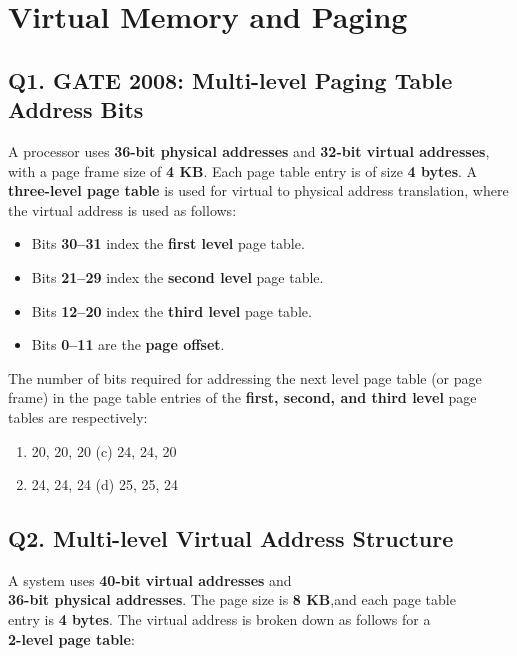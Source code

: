 \section{Virtual Memory and Paging}
\subsection*{Q1. GATE 2008: Multi-level Paging Table Address Bits}

A processor uses \textbf{36-bit physical addresses} and \textbf{32-bit virtual addresses}, with a page frame size of \textbf{4 KB}. Each page table entry is of size \textbf{4 bytes}. A \textbf{three-level page table} is used for virtual to physical address translation, where the virtual address is used as follows:

\begin{itemize}
    \item Bits \textbf{30--31} index the \textbf{first level} page table.
    \item Bits \textbf{21--29} index the \textbf{second level} page table.
    \item Bits \textbf{12--20} index the \textbf{third level} page table.
    \item Bits \textbf{0--11} are the \textbf{page offset}.
\end{itemize}

The number of bits required for addressing the next level page table (or page frame) in the page table entries of the \textbf{first, second, and third level} page tables are respectively:

\begin{enumerate}[label=(\alph*)]
    \item 20, 20, 20 \hspace{5cm} (c) 24, 24, 20
    \item 24, 24, 24 \hspace{5cm} (d) 25, 25, 24
\end{enumerate}

\subsection*{Q2. Multi-level Virtual Address Structure}

A system uses \textbf{40-bit virtual addresses} and\\
\textbf{36-bit physical addresses}. The page size is \textbf{8 KB},and each page table\\ 
entry is \textbf{4 bytes}. The virtual address is broken down as follows for a\\
\textbf{2-level page table}:

